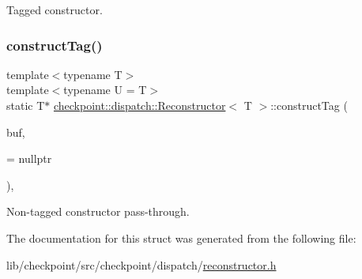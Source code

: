 Tagged constructor. 

\mbox{\label{structcheckpoint_1_1dispatch_1_1_reconstructor_a116025ae56a26ed4d6a51b999f57fd47}} 
\subsubsection{\texorpdfstring{construct\+Tag()}{constructTag()}\hspace{0.1cm}{\footnotesize\ttfamily [2/2]}}
{\footnotesize\ttfamily template$<$typename T$>$ \\
template$<$typename U  = T$>$ \\
static T$\ast$ \hyperlink{structcheckpoint_1_1dispatch_1_1_reconstructor}{checkpoint\+::dispatch\+::\+Reconstructor}$<$ T $>$\+::construct\+Tag (\begin{DoxyParamCaption}\item[{void $\ast$}]{buf,  }\item[{\hyperlink{namespacecheckpoint_a4eb64ee16bff7ef1609e5b98cb16cfb6}{is\+Not\+Tagged\+Constructible\+Type}$<$ U $>$ $\ast$}]{ = {\ttfamily nullptr} }\end{DoxyParamCaption})\hspace{0.3cm}{\ttfamily [inline]}, {\ttfamily [static]}}



Non-\/tagged constructor pass-\/through. 



The documentation for this struct was generated from the following file\+:\begin{DoxyCompactItemize}
\item 
lib/checkpoint/src/checkpoint/dispatch/\hyperlink{reconstructor_8h}{reconstructor.\+h}\end{DoxyCompactItemize}
